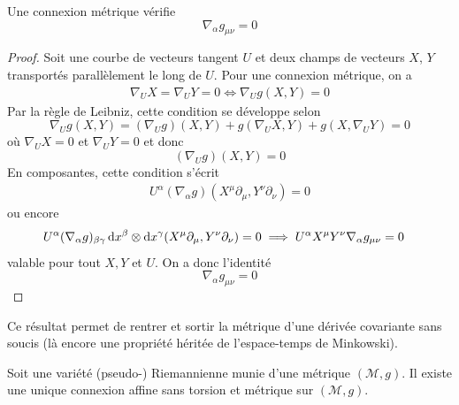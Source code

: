 \begin{theoremframe}
    \begin{lemme}
        Une connexion métrique vérifie
        \begin{equation}
        \label{eq:métrique métrique}
            \nabla_\alpha g_{\mu\nu} = 0
        \end{equation}
    \end{lemme}
\end{theoremframe}
\begin{proof}
    Soit une courbe de vecteurs tangent $U$ et deux champs de vecteurs $X$, $Y$ transportés parallèlement le long de $U$. Pour une connexion métrique, on a
    \begin{align}
        \nabla_U X = \nabla_U Y = 0 \iff \nabla_U g(X,Y) = 0
    \end{align}
    Par la règle de Leibniz, cette condition se développe selon
    \begin{equation}
        \nabla_U g(X, Y) = (\nabla_U g)(X, Y) + g(\nabla_U X, Y) + g(X, \nabla_U Y) = 0
    \end{equation}
    où $\nabla_U X = 0$ et $\nabla_U Y = 0$ et donc
    \begin{equation}
         (\nabla_U g)(X, Y) =0
    \end{equation}
    En composantes, cette condition s'écrit
    \begin{align}
        U^{\alpha}(\nabla_{\alpha}g)(X^{\mu}\partial_{\mu}, Y^{\nu}\partial_{\nu}) = 0
        \label{conexion métrique 1}
    \end{align}
    ou encore
    \begin{align}
        &U^{\alpha}(\nabla_{\alpha}g)_{\beta \gamma} \,\mathrm{d} x^{\beta}\otimes \mathrm{d} x^{\gamma}(X^{\mu}\partial_{\mu}, Y^{\nu}\partial_{\nu}) = 0 \implies U^{\alpha}X^{\mu}Y^{\nu}\nabla_{\alpha}g_{\mu \nu} =0
    \end{align}
    valable pour tout $X,Y$ et $U$. On a donc l'identité
    \begin{equation}
    \nabla_{\alpha}g_{\mu \nu} =0
    \end{equation}
\end{proof}
Ce résultat permet de rentrer et sortir la métrique d'une dérivée covariante sans soucis (là encore une propriété héritée de l'espace-temps de Minkowski).
\begin{theoremframe}
    \begin{theorem}
        \label{thm:fondamental riemannien}
        Soit une variété (pseudo-) Riemannienne munie d'une métrique $(\mathcal{M},g)$. Il existe une unique connexion affine sans torsion et métrique sur $(\mathcal{M},g)$.
    \end{theorem}
\end{theoremframe}  
